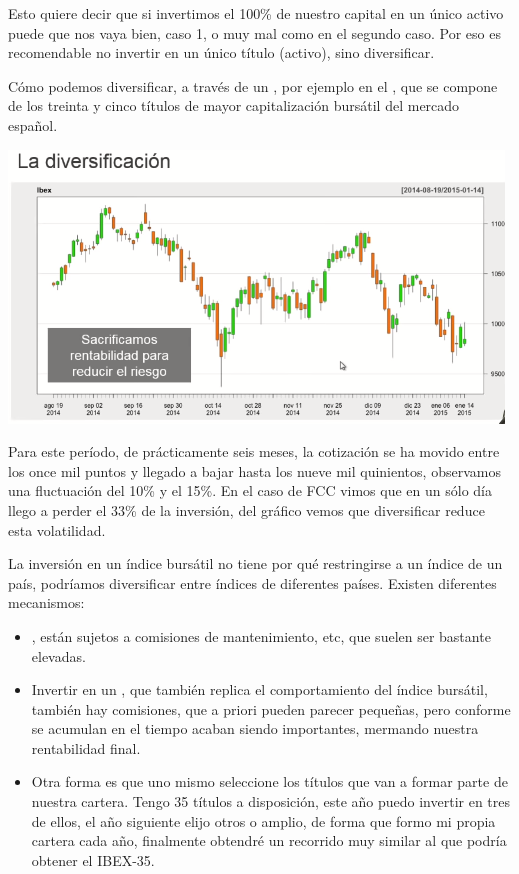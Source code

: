 Esto quiere decir que si invertimos el 100\% de nuestro capital en un único activo puede que nos vaya bien, caso 1, o muy mal como en el segundo caso. Por eso es recomendable no invertir en un único título (activo), sino diversificar.

Cómo podemos diversificar, a través de un , por ejemplo en el , que se compone de los treinta y cinco títulos de mayor capitalización bursátil del mercado español.
\begin{center}
    \includegraphics[scale=0.65]{images/diversificacion-ibex35.png}
\end{center}
Para este período, de prácticamente seis meses, la cotización se ha movido entre los once mil puntos y llegado a bajar hasta los nueve mil quinientos, observamos una fluctuación del 10\% y el 15\%. En el caso de FCC vimos que en un sólo día llego a perder el 33\% de la inversión, del gráfico vemos que diversificar reduce esta volatilidad.

La inversión en un índice bursátil no tiene por qué restringirse a un índice de un país, podríamos diversificar entre índices de diferentes países. Existen diferentes mecanismos:
\begin{itemize}
    \item {}, están sujetos a comisiones de mantenimiento, etc, que suelen ser bastante elevadas.
    \item Invertir en un , que también replica el comportamiento del índice bursátil, también hay comisiones, que a priori pueden parecer pequeñas, pero conforme se acumulan en el tiempo acaban siendo importantes, mermando nuestra rentabilidad final.
    \item Otra forma es que uno mismo seleccione los títulos que van a formar parte de nuestra cartera. Tengo 35 títulos a disposición, este año puedo invertir en tres de ellos, el año siguiente elijo otros o amplio, de forma que formo mi propia cartera cada año, finalmente obtendré un recorrido muy similar al que podría obtener el IBEX-35.
\end{itemize}


